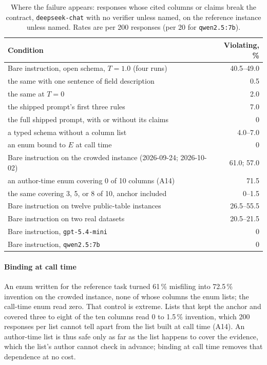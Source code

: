\documentclass[10pt,twocolumn]{article}
\begin{document}
\begin{table}[!htbp]
\caption{Where the failure appears: responses whose cited columns or claims
break the contract, \texttt{deepseek-chat} with no verifier unless named, on
the reference instance unless named. Rates are per 200 responses (per 20 for
\texttt{qwen2.5:7b}).}
\label{tab:conditions}
\centering
\footnotesize
\setlength{\tabcolsep}{3pt}
\begin{tabular}{@{}p{5.3cm}r@{}}
\toprule
Condition & Violating, \% \\
\midrule
Bare instruction, open schema, $T=1.0$ (four runs) & 40.5--49.0 \\
\quad the same with one sentence of field description & 0.5 \\
\quad the same at $T=0$ & 2.0 \\
\quad the shipped prompt's first three rules & 7.0 \\
\quad the full shipped prompt, with or without its claims & 0 \\
\quad a typed schema without a column list & 4.0--7.0 \\
\quad an enum bound to $E$ at call time & 0 \\
Bare instruction on the crowded instance (2026-09-24; 2026-10-02) & 61.0; 57.0 \\
\quad an author-time enum covering 0 of 10 columns (A14) & 71.5 \\
\quad the same covering 3, 5, or 8 of 10, anchor included & 0--1.5 \\
Bare instruction on twelve public-table instances & 26.5--55.5 \\
Bare instruction on two real datasets & 20.5--21.5 \\
Bare instruction, \texttt{gpt-5.4-mini} & 0 \\
Bare instruction, \texttt{qwen2.5:7b} & 0 \\
\bottomrule
\end{tabular}
\end{table}

\paragraph{Binding at call time}
An enum written for the reference task turned 61\,\% misfiling into
72.5\,\% invention on the crowded instance, none of whose columns the enum
lists; the call-time enum read zero. That control is extreme. Lists that kept the
anchor and covered three to eight of the ten columns read 0 to 1.5\,\%
invention, which 200 responses per list cannot tell apart from the list built
at call time (A14). An author-time list is thus safe only as far as the list
happens to cover the evidence, which the list's author cannot check in
advance; binding at call time removes that dependence at no cost.
\end{document}
